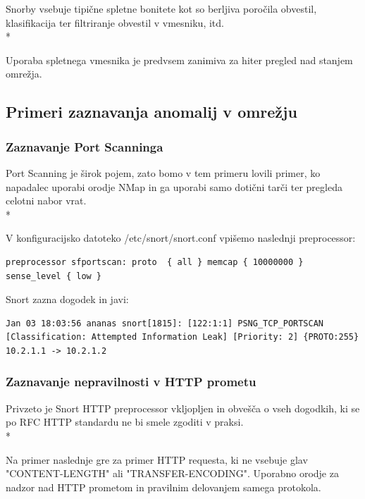 \documentclass[12pt]{article}
\begin{document}
Snorby vsebuje tipične spletne bonitete kot so berljiva poročila obvestil,
klasifikacija ter filtriranje obvestil v vmesniku, itd.
\\*

Uporaba spletnega vmesnika je predvsem zanimiva za hiter pregled nad stanjem omrežja.

\subsection{Primeri zaznavanja anomalij v omrežju}

\subsubsection{Zaznavanje Port Scanninga} %

Port Scanning je širok pojem, zato bomo v tem primeru lovili primer, ko napadalec uporabi orodje NMap
in ga uporabi samo dotični tarči ter pregleda celotni nabor vrat.
\\*

V konfiguracijsko datoteko /etc/snort/snort.conf vpišemo naslednji preprocessor:

\begin{verbatim}
preprocessor sfportscan: proto  { all } memcap { 10000000 } sense_level { low }
\end{verbatim}

Snort zazna dogodek in javi:

\begin{verbatim}
Jan 03 18:03:56 ananas snort[1815]: [122:1:1] PSNG_TCP_PORTSCAN [Classification: Attempted Information Leak] [Priority: 2] {PROTO:255} 10.2.1.1 -> 10.2.1.2
\end{verbatim}


\subsubsection{Zaznavanje nepravilnosti v HTTP prometu} %

Privzeto je Snort HTTP preprocessor vkljopljen in obvešča o vseh dogodkih, ki se po RFC HTTP standardu ne bi smele zgoditi v praksi.
\\*

Na primer naslednje gre za primer HTTP requesta, ki ne vsebuje glav "CONTENT-LENGTH" ali "TRANSFER-ENCODING". Uporabno orodje za nadzor
nad HTTP prometom in pravilnim delovanjem samega protokola.
\end{document}
